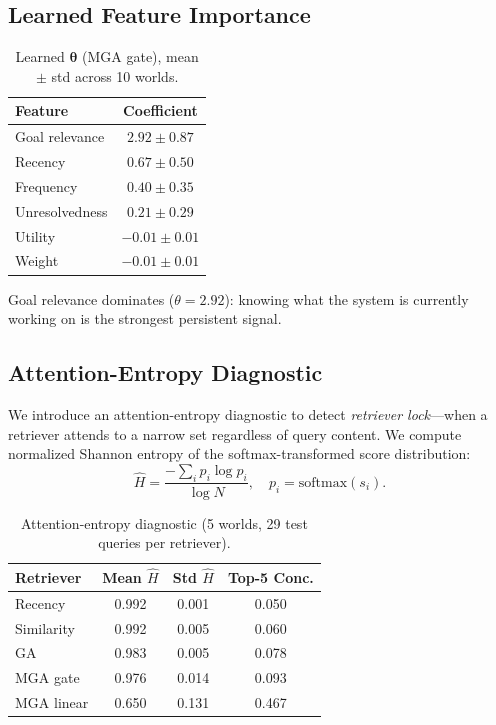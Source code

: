\documentclass{article}
\begin{document}
\subsection{Learned Feature Importance}

\begin{table}[h]
\centering
\caption{Learned $\boldsymbol{\theta}$ (MGA gate), mean $\pm$ std across 10 worlds.}
\vspace{0.5em}
\begin{tabular}{lc}
\toprule
\textbf{Feature} & \textbf{Coefficient} \\
\midrule
Goal relevance & $2.92 \pm 0.87$ \\
Recency & $0.67 \pm 0.50$ \\
Frequency & $0.40 \pm 0.35$ \\
Unresolvedness & $0.21 \pm 0.29$ \\
Utility & $-0.01 \pm 0.01$ \\
Weight & $-0.01 \pm 0.01$ \\
\bottomrule
\end{tabular}
\end{table}

Goal relevance dominates ($\theta = 2.92$): knowing what the system is currently working on is the strongest persistent signal.

\subsection{Attention-Entropy Diagnostic}

We introduce an attention-entropy diagnostic to detect \emph{retriever lock}---when a retriever attends to a narrow set regardless of query content. We compute normalized Shannon entropy of the softmax-transformed score distribution:
\[
\hat{H} = \frac{-\sum_i p_i \log p_i}{\log N}, \quad p_i = \text{softmax}(s_i).
\]

\begin{table}[h]
\centering
\caption{Attention-entropy diagnostic (5 worlds, 29 test queries per retriever).}
\vspace{0.5em}
\begin{tabular}{lccc}
\toprule
\textbf{Retriever} & \textbf{Mean $\hat{H}$} & \textbf{Std $\hat{H}$} & \textbf{Top-5 Conc.} \\
\midrule
Recency & 0.992 & 0.001 & 0.050 \\
Similarity & 0.992 & 0.005 & 0.060 \\
GA & 0.983 & 0.005 & 0.078 \\
MGA gate & 0.976 & 0.014 & 0.093 \\
MGA linear & 0.650 & 0.131 & 0.467 \\
\bottomrule
\end{tabular}
\end{table}
\end{document}
